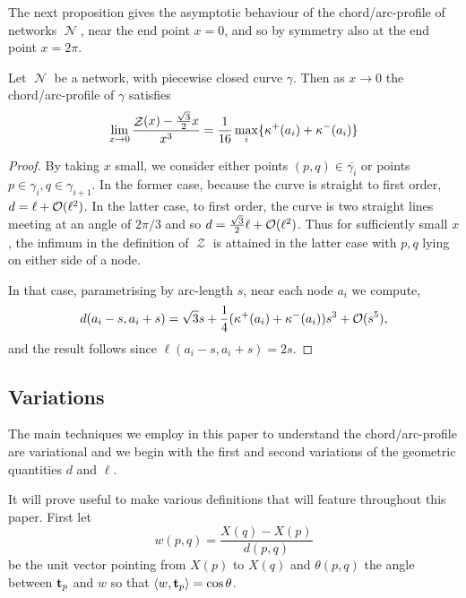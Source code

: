 \documentclass[11pt]{amsart}
\DeclareMathOperator{\chordarcprofile}{\mathcal{Z}}
\DeclareMathOperator{\network}{\mathcal{N}}
\begin{document}
The next proposition gives the asymptotic behaviour of the chord/arc-profile of networks \(\network\), near the end point \(x=0\), and so by symmetry also at the end point \(x=2\pi\).

\begin{prop}
Let \(\network\) be a network, with piecewise closed curve \(\gamma\). Then as \(x\to 0\) the chord/arc-profile of \(\gamma\) satisfies
\[
\lim_{x\to 0} \frac{\chordarcprofile(x) - \tfrac{\sqrt{3}}{2}x}{x^3} = \frac{1}{16} \max_i \{\curvecurv^+(a_i) + \curvecurv^-(a_i)\}
\]
\end{prop}

\begin{proof}
By taking $x$ small, we consider either points $(p,q) \in \overline{\gamma_i}$ or points $p \in \gamma_i, q \in \gamma_{i+1}$. In the former case, because the curve is straight to first order, $d = \ell + \operatorname{\mathcal{O}}(\ell^2)$. In the latter case, to first order, the curve is two straight lines meeting at an angle of $2\pi/3$ and so $d = \tfrac{\sqrt{3}}{2} \ell + \operatorname{\mathcal{O}}(\ell^2)$. Thus for sufficiently small $x$, the infimum in the definition of $\chordarcprofile$ is attained in the latter case with $p,q$ lying on either side of a node.

In that case, parametrising by arc-length $s$, near each node $a_i$ we compute,
\[
d(a_i - s, a_i + s) = \sqrt{3} s + \frac{1}{4} (\operatorname{\kappa}^+(a_i) + \operatorname{\kappa}^-(a_i))s^3 + \operatorname{\mathcal{O}}(s^5),
\]
and the result follows since $\ell(a_i-s, a_i+s) = 2s$.
\end{proof}

\subsection{Variations}
\label{sec:orgheadline8}

The main techniques we employ in this paper to understand the chord/arc-profile are variational and we begin with the first and second variations of the geometric quantities \(d\) and \(\ell\).

It will prove useful to make various definitions that will feature throughout this paper. First let
\[
w(p, q) = \frac{X(q) - X(p)}{d(p,q)}
\]
be the unit vector pointing from \(X(p)\) to \(X(q)\) and \(\theta(p,q)\) the angle between \(\operatorname{\mathbf{t}}_{p}\) and \(w\) so that \(\langle{w},{\operatorname{\mathbf{t}}_p}\rangle = \cos\theta\). 
\end{document}
